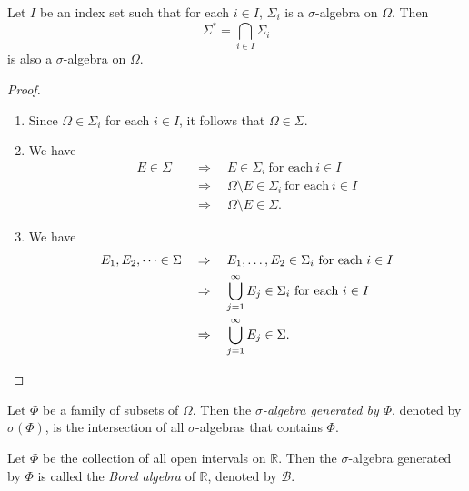 \begin{theorem}
  Let $I$ be an index set such that for each $i \in I$,
  $\Sigma_i$ is a $\sigma$-algebra on $\Omega$.
  Then
  \begin{equation*}
    \Sigma^* = \bigcap_{i \in I} \Sigma_i
  \end{equation*}
  is also a $\sigma$-algebra on $\Omega$.
\end{theorem}
\begin{proof} \leavevmode
  \begin{enumerate}
    \item Since $\Omega \in \Sigma_i$ for each $i \in I$, it follows that
      $\Omega \in \Sigma$.
    \item We have
      \begin{align*}
        E \in \Sigma \quad
        &\Rightarrow \quad E \in \Sigma_i\ \text{for each}\ i \in I \\
        &\Rightarrow \quad \Omega \setminus E \in \Sigma_i
                           \ \text{for each}\ i \in I \\
        &\Rightarrow \quad \Omega \setminus E \in \Sigma.
      \end{align*}
    \item We have
      \begin{align*}
        E_1, E_2, \dots \in \Sigma \quad
        &\Rightarrow \quad E_1, \dots, E_2 \in \Sigma_i
                          \ \text{for each}\ i \in I \\
        &\Rightarrow \quad \bigcup_{j=1}^\infty E_j \in \Sigma_i
                          \ \text{for each}\ i \in I \\
        &\Rightarrow \quad \bigcup_{j=1}^\infty E_j \in \Sigma. \qedhere
      \end{align*}
  \end{enumerate}
\end{proof}

\begin{definition}
  Let $\Phi$ be a family of subsets of $\Omega$.
  Then the \emph{$\sigma$-algebra generated by $\Phi$}, denoted by
  $\sigma(\Phi)$, is the intersection of all $\sigma$-algebras that contains
  $\Phi$.
\end{definition}

\begin{example}
  Let $\Phi$ be the collection of all open intervals on $\mathbb{R}$.
  Then the $\sigma$-algebra generated by $\Phi$ is called the
  \emph{Borel algebra} of $\mathbb{R}$, denoted by $\mathcal{B}$.
\end{example}

